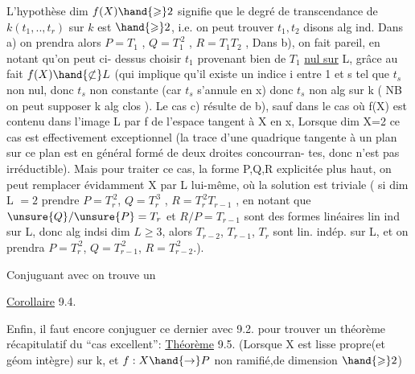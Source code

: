 
L'hypothèse  dim $f(X)\hand{\geqslant} 2$  signifie que  le degré de transcendance de
$k(t_1,..,t_r)$ sur $k$  est $\hand{\geqslant} 2$, i.e. on peut trouver  $t_1,t_2$ disons alg ind.
Dans a) on prendra alors   $P = T_1$ , $Q = T_1^{\,2}$ , $R = T_1T_2$ , Dans b), on
fait pareil,  en notant qu'on peut ci-%
dessus choisir $t_1$ provenant bien de $T_1$ \uline{nul sur} L, grâce au fait $f(X)\hand{\not\subset} L$
(qui implique qu'il  existe un indice  i  entre 1 et s tel que $t_s$ non
nul, donc $t_s$ non constante (car $t_s$ s'annule en x) donc $t_s$  non alg sur k
( NB on peut supposer k alg clos ).  Le cas c) résulte de b),  sauf dans le cas où  f(X) est contenu dans
l'image L par f de l'espace tangent à X en x,  \hand{[}Lorsque dim X=2
ce cas est effectivement exceptionnel (la trace d'une quadrique tangente
à un plan sur ce plan est en général formé de deux droites concourran-%
tes, donc n'est pas irréductible)\hand{]}. Mais pour traiter ce cas,  la
forme P,Q,R explicitée plus haut, on peut remplacer évidamment X par
L lui-même, où la solution est triviale ( si dim L $=2$ prendre $P=T_r^{\,2}$, $Q=T_r^{\,3}$ ,
$R = T_r^{\,2}T_{r-1}$ , en notant que  $\unsure{Q}/\unsure{P} = T_r$ et  $R/P = T_{r-1}$ sont des formes
linéaires lin ind sur L, donc alg indsi dim $L\geqslant 3$, alors $T_{r-2}$, $T_{r-1}$, $T_r$ sont lin. indép. sur L, et on prendra $P=T_r^{\,2}$, $Q=T_{r-1}^{\,2}$, $R=T_{r-2}^{\,2}$.). 

Conjuguant avec  on trouve un

\uline{Corollaire} 9.4.   

Enfin, il faut encore conjuguer  ce dernier avec 9.2. pour
trouver un théorème récapitulatif  du ``cas excellent'':
\uline{Théorème} 9.5.   (Lorsque X est lisse  propre(et géom intègre) sur k, et $f:X\hand{\to} P$ non
ramifié,de dimension $\hand{\geqslant} 2$)

